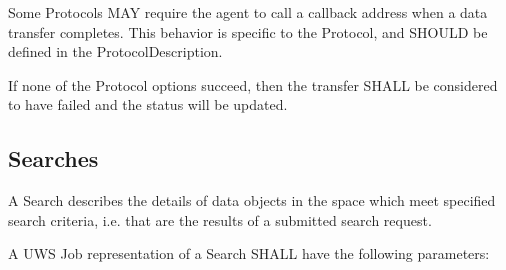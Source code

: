 \documentclass[11pt,a4paper]{ivoa}
\begin{document}
Some Protocols MAY require the agent to call a callback address when a data transfer completes. This behavior is specific to the Protocol, and SHOULD be defined in the ProtocolDescription.

If none of the Protocol options succeed, then the transfer SHALL be considered to have failed and the status will be updated.

\subsection{Searches}
\label{subsec:searches}
A Search describes the details of data objects in the space which meet specified search criteria, i.e. that are the results of a submitted search request.

A UWS Job representation of a Search SHALL have the following parameters:
\end{document}
